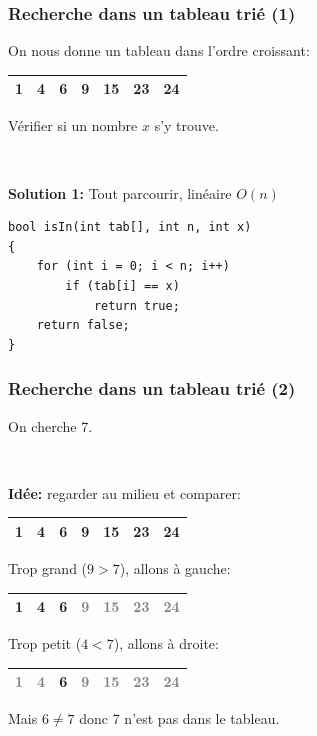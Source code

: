 \documentclass[12pt]{beamer}
\newcommand{\gray}{\textcolor{gray}}
\begin{document}
\begin{frame}[fragile]
\frametitle{Recherche dans un tableau trié (1)}
On nous donne un tableau dans l'ordre croissant:
\begin{center}
\def\arraystretch{1.3}
\begin{tabu} to .7\textwidth {|X[c]|X[c]|X[c]|X[c]|X[c]|X[c]|X[c]|}
 & 4 & 6 & 9 & 15 & 23 & 24 \\
\hline
\end{tabu}
\end{center}
Vérifier si un nombre $x$ s'y trouve.

~

\textbf{Solution 1:} Tout parcourir, linéaire $O(n)$
\begin{lstlisting}
bool isIn(int tab[], int n, int x)
{
    for (int i = 0; i < n; i++)
        if (tab[i] == x)
            return true;
    return false;
}
\end{lstlisting}
\end{frame}

\begin{frame}
\frametitle{Recherche dans un tableau trié (2)}
On cherche 7.

~

\textbf{Idée:} regarder au milieu et comparer:
\begin{center}
\def\arraystretch{1.3}
\begin{tabu} to .7\textwidth {|X[c]|X[c]|X[c]|X[c]|X[c]|X[c]|X[c]|}
 & 4 & 6 & \textbf{9} & 15 & 23 & 24 \\
\hline
\end{tabu}
\end{center}
Trop grand ($9>7$), allons à gauche:
\begin{center}
\def\arraystretch{1.3}
\begin{tabu} to .7\textwidth {|X[c]|X[c]|X[c]|X[c]|X[c]|X[c]|X[c]|}
 & \textbf{4} & 6 & \gray{9} & \gray{15} & \gray{23} & \gray{24} \\
\hline
\end{tabu}
\end{center}
Trop petit ($4<7$), allons à droite:
\begin{center}
\def\arraystretch{1.3}
\begin{tabu} to .7\textwidth {|X[c]|X[c]|X[c]|X[c]|X[c]|X[c]|X[c]|}
\hline
\gray{1} & \gray{4} & \textbf{6} & \gray{9} & \gray{15} & \gray{23} & \gray{24} \\
\hline
\end{tabu}
\end{center}
Mais $6\neq7$ donc 7 n'est pas dans le tableau.
\end{frame}
\end{document}
